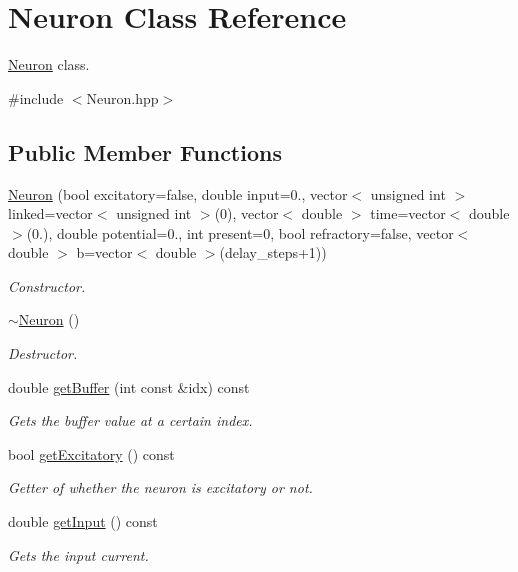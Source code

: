 \hypertarget{classNeuron}{\section{Neuron Class Reference}
\label{classNeuron}
}


\hyperlink{classNeuron}{Neuron} class.  




{\ttfamily \#include $<$Neuron.\-hpp$>$}

\subsection*{Public Member Functions}
\begin{DoxyCompactItemize}
\item 
\hyperlink{classNeuron_a3778933b884dea19411358a851a65ed2}{Neuron} (bool excitatory=false, double input=0., vector$<$ unsigned int $>$ linked=vector$<$ unsigned int $>$(0), vector$<$ double $>$ time=vector$<$ double $>$(0.), double potential=0., int present=0, bool refractory=false, vector$<$ double $>$ b=vector$<$ double $>$(delay\-\_\-steps+1))
\begin{DoxyCompactList}\small\item\em Constructor. \end{DoxyCompactList}\item 
\hyperlink{classNeuron_a94a250ce7e167760e593979b899745b1}{$\sim$\-Neuron} ()
\begin{DoxyCompactList}\small\item\em Destructor. \end{DoxyCompactList}\item 
double \hyperlink{classNeuron_a020167e5c41dcb992c17029aaee2af01}{get\-Buffer} (int const \&idx) const 
\begin{DoxyCompactList}\small\item\em Gets the buffer value at a certain index. \end{DoxyCompactList}\item 
bool \hyperlink{classNeuron_a185f67cb52f92805222fcef8e8236e43}{get\-Excitatory} () const 
\begin{DoxyCompactList}\small\item\em Getter of whether the neuron is excitatory or not. \end{DoxyCompactList}\item 
double \hyperlink{classNeuron_a9519b367ae5080ae9ed9c796685853f8}{get\-Input} () const 
\begin{DoxyCompactList}\small\item\em Gets the input current. \end{DoxyCompactList}\item 

\end{DoxyCompactItemize}
